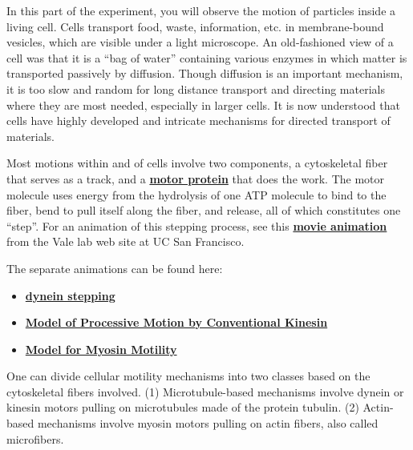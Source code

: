 \documentclass{../lab}
\begin{document}
In this part of the experiment, you will observe the motion of particles inside a living cell. Cells transport food, waste, information, etc. in membrane-bound vesicles, which are visible under a light microscope. An old-fashioned view of a cell was that it is a ``bag of water'' containing various enzymes in which matter is transported passively by diffusion. Though diffusion is an important mechanism, it is too slow and random for long distance transport and directing materials where they are most needed, especially in larger cells. It is now understood that cells have highly developed and intricate mechanisms for directed transport of materials.

Most motions within and of cells involve two components, a cytoskeletal fiber that serves as a track, and a \href{http://physics111.lib.berkeley.edu/Physics111/Reprints/OTZ/biowikipedia.pdf}{\textbf{motor protein}} that does the work. The motor molecule uses energy from the hydrolysis of one ATP molecule to bind to the fiber, bend to pull itself along the fiber, and release, all of which constitutes one ``step''. For an animation of this stepping process, see this \href{https://valelab.ucsf.edu/molecular-animations/}{\textbf{movie animation}} from the Vale lab web site at UC San Francisco. 

The separate animations can be found here:

\begin{itemize}
    \item \href{http://experimentationlab.berkeley.edu/sites/default/files/dyneinstepping.mp4}{\textbf{dynein stepping}}
    
    \item \href{http://experimentationlab.berkeley.edu/sites/default/files/motionbykinesin.mp4}{\textbf{Model of Processive Motion by Conventional Kinesin}}
    
    \item \href{http://experimentationlab.berkeley.edu/sites/default/files/myosinmotility.mp4}{\textbf{Model for Myosin Motility}}

\end{itemize}

One can divide cellular motility mechanisms into two classes based on the cytoskeletal fibers involved. (1) Microtubule-based mechanisms involve dynein or kinesin motors pulling on microtubules made of the protein tubulin. (2) Actin-based mechanisms involve myosin motors pulling on actin fibers, also called microfibers.
\end{document}
